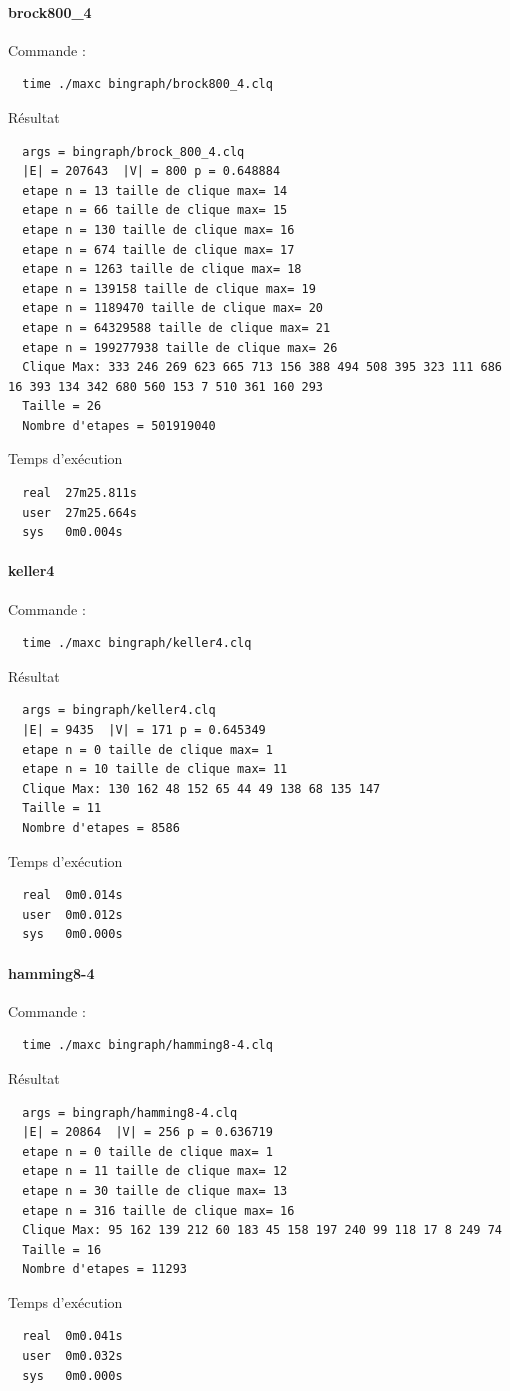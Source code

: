 \documentclass{article}
\begin{document}
\paragraph{brock800\_4}
Commande :
\begin{verbatim}
  time ./maxc bingraph/brock800_4.clq
\end{verbatim}
Résultat
\begin{verbatim}
  args = bingraph/brock_800_4.clq
  |E| = 207643  |V| = 800 p = 0.648884
  etape n = 13 taille de clique max= 14
  etape n = 66 taille de clique max= 15
  etape n = 130 taille de clique max= 16
  etape n = 674 taille de clique max= 17
  etape n = 1263 taille de clique max= 18
  etape n = 139158 taille de clique max= 19
  etape n = 1189470 taille de clique max= 20
  etape n = 64329588 taille de clique max= 21
  etape n = 199277938 taille de clique max= 26
  Clique Max: 333 246 269 623 665 713 156 388 494 508 395 323 111 686 16 393 134 342 680 560 153 7 510 361 160 293
  Taille = 26
  Nombre d'etapes = 501919040
\end{verbatim}
Temps d'exécution
\begin{verbatim}
  real  27m25.811s
  user  27m25.664s
  sys   0m0.004s
\end{verbatim}
\paragraph{keller4}
Commande :
\begin{verbatim}
  time ./maxc bingraph/keller4.clq
\end{verbatim}
Résultat
\begin{verbatim}
  args = bingraph/keller4.clq
  |E| = 9435  |V| = 171 p = 0.645349
  etape n = 0 taille de clique max= 1
  etape n = 10 taille de clique max= 11
  Clique Max: 130 162 48 152 65 44 49 138 68 135 147
  Taille = 11
  Nombre d'etapes = 8586
\end{verbatim}
Temps d'exécution
\begin{verbatim}
  real  0m0.014s
  user  0m0.012s
  sys   0m0.000s
\end{verbatim}
\paragraph{hamming8-4}
Commande :
\begin{verbatim}
  time ./maxc bingraph/hamming8-4.clq
\end{verbatim}
Résultat
\begin{verbatim}
  args = bingraph/hamming8-4.clq
  |E| = 20864  |V| = 256 p = 0.636719
  etape n = 0 taille de clique max= 1
  etape n = 11 taille de clique max= 12
  etape n = 30 taille de clique max= 13
  etape n = 316 taille de clique max= 16
  Clique Max: 95 162 139 212 60 183 45 158 197 240 99 118 17 8 249 74
  Taille = 16
  Nombre d'etapes = 11293
\end{verbatim}
Temps d'exécution
\begin{verbatim}
  real  0m0.041s
  user  0m0.032s
  sys   0m0.000s

\end{verbatim}
\end{document}
